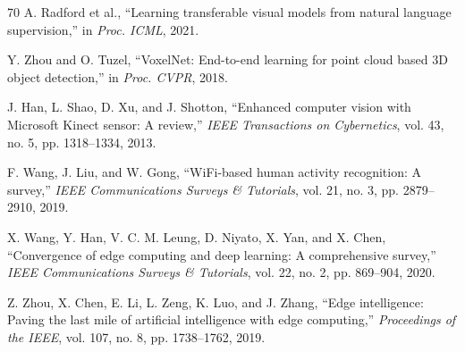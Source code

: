 \documentclass[journal]{IEEEtran}
\begin{document}
\begin{thebibliography}{70}
A. Radford et al., ``Learning transferable visual models from natural language supervision,'' in \emph{Proc. ICML}, 2021.

Y. Zhou and O. Tuzel, ``VoxelNet: End-to-end learning for point cloud based 3D object detection,'' in \emph{Proc. CVPR}, 2018.

J. Han, L. Shao, D. Xu, and J. Shotton, ``Enhanced computer vision with Microsoft Kinect sensor: A review,'' \emph{IEEE Transactions on Cybernetics}, vol. 43, no. 5, pp. 1318--1334, 2013.

F. Wang, J. Liu, and W. Gong, ``WiFi-based human activity recognition: A survey,'' \emph{IEEE Communications Surveys \& Tutorials}, vol. 21, no. 3, pp. 2879--2910, 2019.

X. Wang, Y. Han, V. C. M. Leung, D. Niyato, X. Yan, and X. Chen, ``Convergence of edge computing and deep learning: A comprehensive survey,'' \emph{IEEE Communications Surveys \& Tutorials}, vol. 22, no. 2, pp. 869--904, 2020.

Z. Zhou, X. Chen, E. Li, L. Zeng, K. Luo, and J. Zhang, ``Edge intelligence: Paving the last mile of artificial intelligence with edge computing,'' \emph{Proceedings of the IEEE}, vol. 107, no. 8, pp. 1738--1762, 2019.

\end{thebibliography}
\fi



\end{document}
